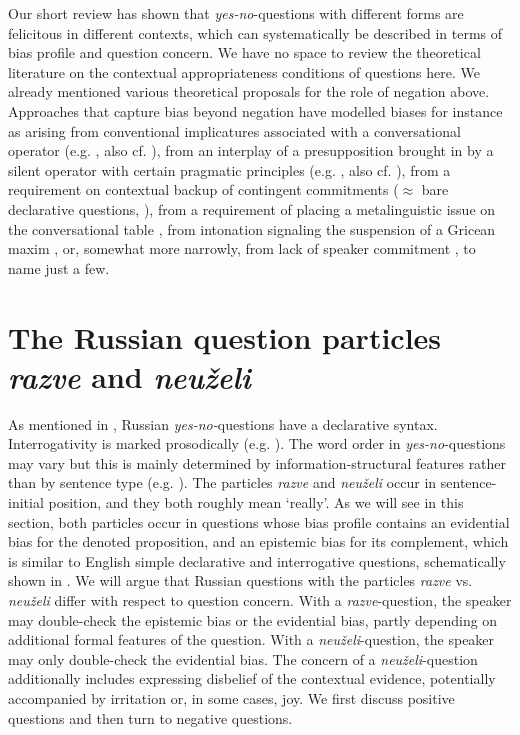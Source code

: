\documentclass[output=paper,colorlinks,citecolor=brown]{langscibook}
\begin{document}
Our short review has shown that \textit{yes-no}-questions with different forms are felicitous in different contexts, which can systematically be described in terms of bias profile and question concern. We have no space to review the theoretical literature on the contextual appropriateness conditions of questions here. We already mentioned various theoretical proposals for the role of negation above. Approaches that capture bias beyond negation have modelled biases for instance as arising from conventional implicatures associated with a conversational operator (e.g. \cite{romerohan2004negative}, also cf. \cite{repp_negation_2009, Repp13}), from an interplay of a presupposition brought in by a silent operator with certain pragmatic principles (e.g. \cite{Trinh2014}, also cf. \cite{Seeliger18}), from a requirement on contextual backup of contingent commitments ($\approx$ bare declarative questions, \cite{gunlogson08}), from a requirement of placing a metalinguistic issue on the conversational table \citep{Malamud2015}, from intonation signaling the suspension of a Gricean maxim \citep{westera17}, or, somewhat more narrowly, from lack of speaker commitment \citep{rudin18, goodhue21:lsa}, to name just a few.

\section{The Russian question particles \textit{razve} and \textit{neuželi}}\label{sec:05:3}

As mentioned in , Russian \textit{yes-no-}questions have a declarative syntax. Interrogativity is marked prosodically (e.g. \citealt{bryzgunova80, Ode89, meyer04, meyer06}). The word order in \textit{yes-no}-questions may vary but this is mainly determined by information-structural features rather than by sentence type (e.g. \citealt{king94}). The particles \textit{razve} and \textit{neuželi} occur in sentence-initial position, and they both roughly mean `really'. As we will see in this section, both particles occur in questions whose bias profile contains an evidential bias for the denoted proposition, and an epistemic bias for its complement, which is similar to English simple declarative and interrogative questions, schematically shown in . We will argue that Russian questions with the particles \textit{razve} vs. \textit{neuželi} differ with respect to question concern. With a \textit{razve}-question, the speaker may double-check the epistemic bias or the evidential bias, partly depending on additional formal features of the question. With a \textit{neuželi}-question, the speaker may only double-check the evidential bias. The concern of a \textit{neuželi}-question additionally includes expressing disbelief of the contextual evidence, potentially accompanied by irritation or, in some cases, joy. We first discuss positive questions and then turn to negative questions.
\end{document}
